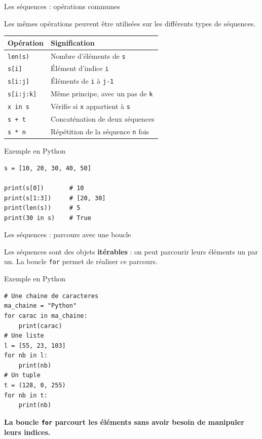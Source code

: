 \documentclass[10pt]{beamer}
\begin{document}
\begin{frame}[fragile]{Les séquences : opérations communes}

Les mêmes opérations peuvent être utilisées sur les
différents types de séquences.

\medskip

\small
\begin{center}
\begin{tabular}{|l|l|}
\hline
\textbf{Opération} & \textbf{Signification} \\
\hline
\texttt{len(s)} & Nombre d'éléments de \texttt{s} \\
\hline
\texttt{s[i]} & Élément d'indice \texttt{i} \\
\hline
\texttt{s[i:j]} & Éléments de \texttt{i} à \texttt{j-1} \\
\hline
\texttt{s[i:j:k]} & Même principe, avec un pas de \texttt{k} \\
\hline
\texttt{x in s} & Vérifie si \texttt{x} appartient à \texttt{s} \\
\hline
\texttt{s + t} & Concaténation de deux séquences \\
\hline
\texttt{s * n} & Répétition de la séquence \texttt{n} fois \\
\hline
\end{tabular}
\end{center}

\normalsize

\medskip

\begin{exampleblock}{Exemple en Python}
\begin{lstlisting}
s = [10, 20, 30, 40, 50]

print(s[0])       # 10
print(s[1:3])     # [20, 30]
print(len(s))     # 5
print(30 in s)    # True
\end{lstlisting}
\end{exampleblock}

\end{frame}
\begin{frame}[fragile]{Les séquences : parcours avec une boucle}

Les séquences sont des objets \textbf{itérables} :
on peut parcourir leurs éléments un par un.
La boucle \texttt{for} permet de réaliser ce parcours.

\begin{exampleblock}{Exemple en Python}
\begin{lstlisting}
# Une chaine de caracteres
ma_chaine = "Python"
for carac in ma_chaine:
    print(carac)
# Une liste
l = [55, 23, 103]
for nb in l:
    print(nb)
# Un tuple
t = (128, 0, 255)
for nb in t:
    print(nb)
\end{lstlisting}
\end{exampleblock}


\textbf{La boucle \texttt{for} parcourt les éléments
sans avoir besoin de manipuler leurs indices.}


\end{frame}
\end{document}
